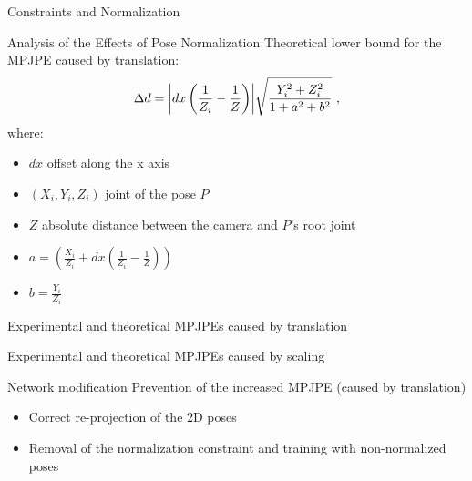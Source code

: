 \documentclass[8pt]{beamer}
\begin{document}
\begin{frame}[t]{Constraints and Normalization}
\begin{figure}
{\begin{subfigure}{.45\textwidth}
{
			}
			\end{subfigure}
		}
		\hspace{.5cm}
		\end{figure}
		\vfill

	\end{frame}

	\begin{frame}{Analysis of the Effects of Pose Normalization}
	Theoretical lower bound for the MPJPE caused by translation:
	\begin{equation*}
		\Delta d = \abs{dx \left (\frac{1}{Z_i} - \frac{1}{Z} \right )} \sqrt{\frac{Y_i^2 + Z_i^2}{1 + a^2 + b^2}} \ , 
	\end{equation*}
	where:
	\begin{itemize}
		\item $dx$ offset along the x axis
		\item $(X_i, Y_i, Z_i)$ joint of the pose $P$
		\item $Z$ absolute distance between the camera and $P$'s root joint
		\item $a = \left( \frac{X_i}{Z_i} + dx \left( \frac{1}{Z_i} - \frac{1}{Z} \right) \right )$
		\item $b = \frac{Y_i}{Z_i}$
	\end{itemize}  
	\end{frame}

	\begin{frame}{Experimental and theoretical MPJPEs caused by translation}
		
	\end{frame}

	\begin{frame}{Experimental and theoretical MPJPEs caused by scaling}
		
	\end{frame}

	\begin{frame}{Network modification}
		Prevention of the increased MPJPE (caused by translation)
		\begin{itemize}
			\item Correct re-projection of the 2D poses
			\item Removal of the normalization constraint and training with non-normalized poses
		\end{itemize}
	\end{frame}
\end{document}
